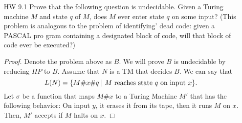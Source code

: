 \documentclass{article}
\newcommand{\setst}{\hspace{1mm} | \hspace{1mm} }
\theoremstyle{definition}
\newtheorem*{solution*}{Solution}
\begin{document}
\begin{enumerate}
\begin{solution*}
		Here is an example on a string of length 3. 
		\begin{align*}
		&\vdash aaa\textvisiblespace\ldots \\
		&\vdash aaa \dashv\textvisiblespace\ldots \\
		&\vdash \bar{a}\bar{a}\bar{a} \dashv\textvisiblespace\ldots \\
		&\vdash\$ \bar{a}\bar{a}\bar{a} \dashv \textvisiblespace\ldots\\
		&\vdash\hat{a}\hat{a}\hat{a}\$ \bar{a}\bar{a}\bar{a} \dashv\textvisiblespace\ldots \\
		&\vdash\hat{a}\hat{a}\$ \bar{a}\bar{a}\bar{a} \dashv\textvisiblespace\ldots \\
		&\vdash\textvisiblespace\hat{a}\$ \bar{a}\bar{a}\bar{a} \dashv\textvisiblespace\ldots\quad\text{ in 3 ``steps'' we get} \\
		&\vdash\textvisiblespace\hat{a}\$ \tilde{a}\tilde{a}\tilde{a}aaa \dashv\textvisiblespace\ldots \\
		&\vdash\textvisiblespace\hat{a}\$ \bar{a}\bar{a}\bar{a}aaa \dashv\textvisiblespace\ldots \\
		&\vdash\textvisiblespace\textvisiblespace\$ \bar{a}\bar{a}\bar{a}aaa \dashv\textvisiblespace\ldots \\
		&\vdash\textvisiblespace\textvisiblespace\$ \tilde{a}\tilde{a}\tilde{a}aaaaaa \dashv\textvisiblespace\ldots \\
		&\vdash\tilde{a}\tilde{a}\tilde{a}aaaaaa \dashv\textvisiblespace\ldots \\
		&\vdash aaaaaaaaa \dashv\textvisiblespace\ldots \\
		\end{align*}
		The main idea of the algorithm is that the $\hat{a}$ keep track how many times we want to multiply the string's length by itself. We only want $m-1\ \hat{a}$'s since we already have a $m$ $a$'s on the tape. Each time we say a $\hat{a}$, we increase the number of $a$'s on the right side by $m$. So, at the end of this process, the number of $a$'s on the right side will be $m + (m-1)m = m^2$. 
	\end{solution*}
	\item[HW 9.1] Prove that the following question is undecidable. Given a Turing machine $M$ and state $q$ of $M$, does $M$ ever enter state $q$ on some input?
	(This problem is analogous to the problem of identifying' dead code:
	given a PASCAL pro gram containing a designated block of code, will
	that block of code ever be executed?)
	\begin{proof}
		Denote the problem above as $B$. We will prove $B$ is undecidable by reducing $HP$ to $B$. Assume that $N$ is a TM that decides $B$. We can say that 
		\[L(N) = \{M\#x\#q \setst M \text{ reaches state } q \text{ on input } x\}.\]
		Let $\sigma$ be a function that maps $M\#x$ to a Turing Machine $M'$ that has the following behavior: On input $y$, it erases it from its tape, then it runs $M$ on $x$. Then, $M'$ accepts if $M$ halts on $x$. 
		

\end{proof}
\end{enumerate}
\end{document}
